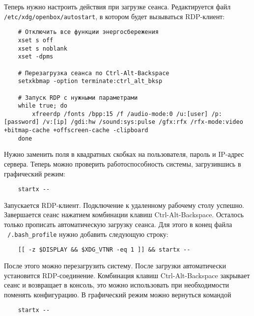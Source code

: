Теперь нужно настроить действия при загрузке сеанса. Редактируется файл
\texttt{/etc/xdg/openbox/autostart}, в котором будет вызываться RDP-клиент:
\begin{verbatim}
    # Отключить все функции энергосбережения
    xset s off
    xset s noblank
    xset -dpms

    # Перезагрузка сеанса по Ctrl-Alt-Backspace
    setxkbmap -option terminate:ctrl_alt_bksp

    # Запуск RDP с нужными параметрами
    while true; do
        xfreerdp /fonts /bpp:15 /f /audio-mode:0 /u:[user] /p:[password] /v:[ip] /gdi:hw /sound:sys:pulse /gfx:rfx /rfx-mode:video +bitmap-cache +offscreen-cache -clipboard
    done
\end{verbatim}

Нужно заменить поля в квадратных скобках на пользователя, пароль и IP-адрес сервера.
Теперь можно проверить работоспособность системы, загрузившись в графический режим:

\begin{verbatim}
    startx --
\end{verbatim}

Запускается RDP-клиент. Подключение к удаленному рабочему столу успешно. Завершается
сеанс нажатием комбинации клавиш Ctrl-Alt-Backspace. Осталось только прописать
автоматическую загрузку сеанса. Для этого в конец файла \texttt{~/.bash\_profile} нужно
добавить следующую строку:

\begin{verbatim}
    [[ -z $DISPLAY && $XDG_VTNR -eq 1 ]] && startx --
\end{verbatim}

После этого можно перезагрузить систему. После загрузки автоматически установится
RDP-соединение. Комбинация клавиш Ctrl-Alt-Backspace закрывает сеанс и возвращает в
консоль, это можно использовать при необходимости поменять конфигурацию. В графический
режим можно вернуться командой 
\begin{verbatim}
    startx --
\end{verbatim}

